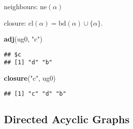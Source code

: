 \documentclass[]{article}
\newenvironment{Shaded}{\begin{snugshade}}{\end{snugshade}}
\newcommand{\KeywordTok}[1]{\textcolor[rgb]{0.13,0.29,0.53}{\textbf{#1}}}
\newcommand{\StringTok}[1]{\textcolor[rgb]{0.31,0.60,0.02}{#1}}
\newcommand{\NormalTok}[1]{#1}
\begin{document}
neighbours: \(\mathrm{ne}(\alpha)\)

closure: \(\mathrm{cl}(\alpha)=\mathrm{bd}(\alpha)\cup \{\alpha\}\).

\begin{Shaded}
\begin{Highlighting}[]
\KeywordTok{adj}\NormalTok{(ug0, }\StringTok{"c"}\NormalTok{)}
\end{Highlighting}
\end{Shaded}

\begin{verbatim}
## $c
## [1] "d" "b"
\end{verbatim}

\begin{Shaded}
\begin{Highlighting}[]
\KeywordTok{closure}\NormalTok{(}\StringTok{"c"}\NormalTok{, ug0)}
\end{Highlighting}
\end{Shaded}

\begin{verbatim}
## [1] "c" "d" "b"
\end{verbatim}

\subsection{Directed Acyclic Graphs}\label{directed-acyclic-graphs}
\end{document}
